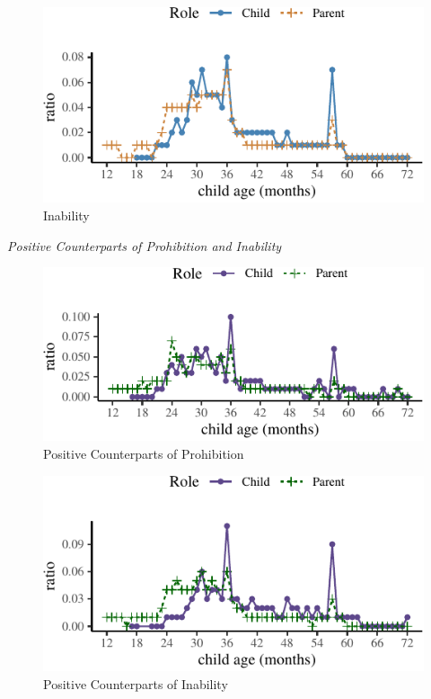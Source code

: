 \documentclass[
  english,
  man,floatsintext]{apa6}
\begin{document}
\begin{figure}[H]

{\centering \includegraphics{neg_combos_full_files/figure-latex/inability-1} 

}

\caption{Inability}\label{fig:inability}
\end{figure}

\emph{Positive Counterparts of Prohibition and Inability}

\begin{figure}[H]

{\centering \includegraphics{neg_combos_full_files/figure-latex/posprohibition-1} 

}

\caption{Positive Counterparts of Prohibition}\label{fig:posprohibition}
\end{figure}

\begin{figure}[H]

{\centering \includegraphics{neg_combos_full_files/figure-latex/posinability-1} 

}

\caption{Positive Counterparts of Inability}\label{fig:posinability}
\end{figure}
\end{document}
